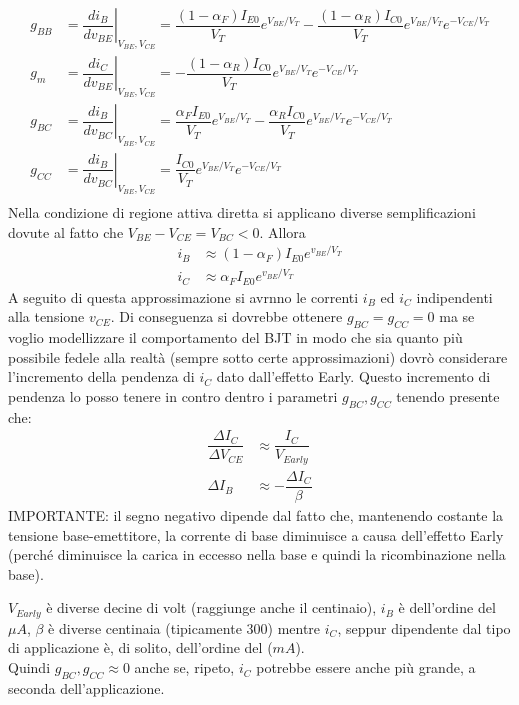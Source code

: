 %
\begin{exbox}
    \begin{align}
    g_{BB} &= \left.\dfrac{di_B}{dv_{BE}}\right|_{V_{BE},V_{CE}} = \dfrac{(1-\alpha_F)I_{E0}}{V_T}e^{V_{BE}/V_T}-\dfrac{(1-\alpha_R)I_{C0}}{V_T}e^{V_{BE}/V_T}e^{-V_{CE}/V_T}\\
    g_{m} &= \left. \dfrac{di_C}{dv_{BE}}\right|_{V_{BE},V_{CE}}=-\dfrac{(1-\alpha_R)I_{C0}}{V_T}e^{V_{BE}/V_T}e^{-V_{CE}/V_T}\\ 
    g_{BC} &= \left. \dfrac{di_B}{dv_{BC}}\right|_{V_{BE},V_{CE}}= \dfrac{\alpha_F I_{E0}}{V_T}e^{V_{BE}/V_T}-\dfrac{\alpha_R I_{C0}}{V_T}e^{V_{BE}/V_T}e^{-V_{CE}/V_T}\\
    g_{CC} &= \left. \dfrac{di_B}{dv_{BC}}\right|_{V_{BE},V_{CE}}= \dfrac{I_{C0}}{V_T}e^{V_{BE}/V_T}e^{-V_{CE}/V_T}\\
\end{align}
Nella condizione di regione attiva diretta si applicano diverse semplificazioni dovute al fatto che $V_{BE}-V_{CE}=V_{BC}<0$. Allora
%
\begin{align}
    i_B &\approx (1-\alpha_F)I_{E0}e^{v_{BE}/V_T}\\
    i_C &\approx \alpha_F I_{E0}e^{v_{BE}/V_T}
\end{align}
%
A seguito di questa approssimazione si avrnno le correnti $i_B$ ed $i_C$ indipendenti alla tensione $v_{CE}$. Di conseguenza si dovrebbe ottenere $g_{BC}= g_{CC} = 0$ ma se voglio modellizzare il comportamento del BJT in modo che sia quanto più possibile fedele alla realtà (sempre sotto certe approssimazioni) dovrò considerare l'incremento della pendenza di $i_C$ dato dall'effetto Early.
Questo incremento di pendenza lo posso tenere in contro dentro i parametri $g_{BC}, g_{CC}$ tenendo presente che:
%
\begin{align}
    \dfrac{\Delta I_C}{\Delta V_{CE}} &\approx \dfrac{I_C}{V_{Early}}\\
    \Delta I_B &\approx -\dfrac{\Delta I_C}{\beta}
\end{align}
%
IMPORTANTE: il segno negativo dipende dal fatto che, mantenendo costante la tensione
base-emettitore, la corrente di base diminuisce a causa dell'effetto Early (perché
diminuisce la carica in eccesso nella base e quindi la ricombinazione nella base).

\begin{ripasso}
    $V_{Early}$ è diverse decine di volt (raggiunge anche il centinaio), $i_B$ è dell'ordine del $\mu A$, $\beta$ è diverse centinaia (tipicamente 300) mentre $i_C$, seppur dipendente dal tipo di applicazione è, di solito, dell'ordine del ($m A$).\\
    Quindi $g_{BC}, g_{CC} \approx 0$ anche se, ripeto, $i_C$ potrebbe essere anche più grande, a seconda dell'applicazione.
\end{ripasso}
%
\end{exbox}
